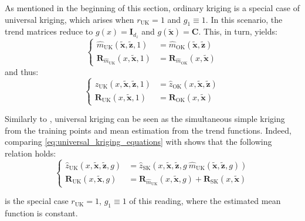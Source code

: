 \begin{remark}
	As mentioned in the beginning of this section, ordinary kriging is a special case of universal kriging, which arises when $r_{\mathrm{UK}}=1$ and $g_1\equiv1$. In this scenario, the trend matrices reduce to $g(x)=\mathbf{I}_{d_z}$ and $g(\tilde{\mathbf{x}})=\mathbf{C}$. This, in turn, yields:
	\begin{equation}
		\left\{\begin{aligned}
		\hat{m}_{\mathrm{UK}}(\tilde{\mathbf{x}},\tilde{\mathbf{z}},1)&=\hat{m}_{\mathrm{OK}}(\tilde{\mathbf{x}},\tilde{\mathbf{z}})\\
		\mathbf{R}_{\hat{m}_{\mathrm{UK}}}(x,\tilde{\mathbf{x}},1)&=\mathbf{R}_{\hat{m}_{\mathrm{OK}}}(x,\tilde{\mathbf{x}})
		\end{aligned}\right.
	\end{equation}
	and thus:
	\begin{equation}
		\left\{\begin{aligned}
		\hat{z}_{\mathrm{UK}}(x,\tilde{\mathbf{x}},\tilde{\mathbf{z}},1)&=\hat{z}_{\mathrm{OK}}(x,\tilde{\mathbf{x}},\tilde{\mathbf{z}})\\
		\mathbf{R}_{\mathrm{UK}}(x,\tilde{\mathbf{x}},1)&=\mathbf{R}_{\mathrm{OK}}(x,\tilde{\mathbf{x}})
		\end{aligned}\right.
	\end{equation}

	Similarly to , universal kriging can be seen as the simultaneous simple kriging from the training points and mean estimation from the trend functions. Indeed, comparing \eqref{eq:universal_kriging_equations} with  shows that the following relation holds:
	\begin{equation}
		\left\{\begin{aligned}
		\hat{z}_{\mathrm{UK}}(x,\tilde{\mathbf{x}},\tilde{\mathbf{z}},g)&=\hat{z}_{\mathrm{SK}}\left(x,\tilde{\mathbf{x}},\tilde{\mathbf{z}},g\:\hat{m}_{\mathrm{UK}}(\tilde{\mathbf{x}},\tilde{\mathbf{z}},g)\right)\\
		\mathbf{R}_{\mathrm{UK}}(x,\tilde{\mathbf{x}},g)&=\mathbf{R}_{\hat{m}_{\mathrm{UK}}}(x,\tilde{\mathbf{x}},g)+\mathbf{R}_{\mathrm{SK}}(x,\tilde{\mathbf{x}})
		\end{aligned}\right.
	\end{equation}

	 is the special case $r_{\mathrm{UK}}=1$, $g_1\equiv1$ of this reading, where the estimated mean function is constant.
\end{remark}


